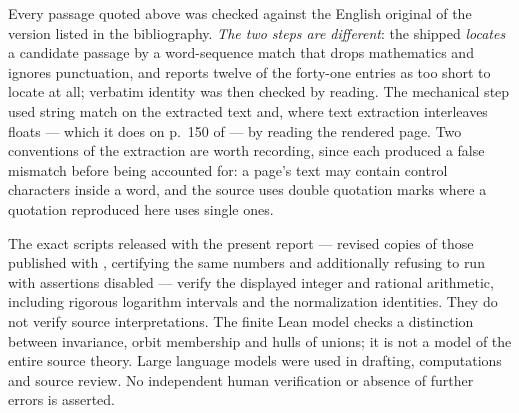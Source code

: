 \documentclass[11pt]{article}
\theoremstyle{plain}
\theoremstyle{definition}
\begin{document}
Every passage quoted above was checked against the English original of the version
listed in the bibliography.  \emph{The two steps are different}: the shipped
 \emph{locates} a candidate passage by a word-sequence
match that drops mathematics and ignores punctuation, and reports twelve of the forty-one
entries as too short to locate at all; verbatim identity was then checked by reading.
The mechanical step used string match on the extracted text and, where text
extraction interleaves floats --- which it does on p.~150 of \cite{IUT3} --- by
reading the rendered page.  Two conventions of the extraction are worth recording,
since each produced a false mismatch before being accounted for: a page's text may
contain control characters inside a word, and the source uses double quotation marks
where a quotation reproduced here uses single ones.

The exact scripts released with the present report --- revised copies of those
published with \cite{First}, certifying the same numbers and additionally refusing to
run with assertions disabled --- verify the displayed
integer and rational arithmetic, including rigorous logarithm intervals and
the normalization identities.  They do not verify source interpretations.
The finite Lean model checks a distinction between invariance, orbit
membership and hulls of unions; it is not a model of the entire source theory.
Large language models were used in drafting, computations and source review.
No independent human verification or absence of further errors is asserted.
\end{document}
